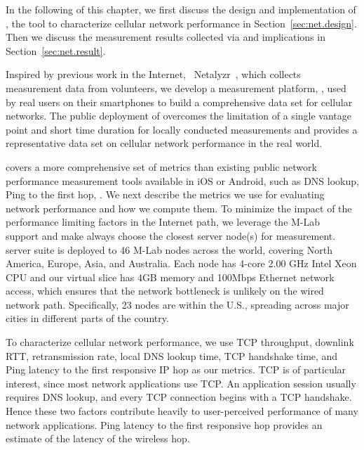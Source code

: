 In the following of this chapter, we first discuss the design and implementation of \mobiperf, the tool to characterize cellular network performance in Section~\ref{sec:net.design}. Then we discuss the measurement results collected via \mobiperf and implications in Section~\ref{sec:net.result}.


\label{sec:net.design}

Inspired by previous work in the Internet, \eg~Netalyzr~\cite{netalyzr}, which collects measurement data from volunteers, we develop a measurement platform, \mobiperf, used by real users on their smartphones to build a comprehensive data set for cellular networks. The public deployment of \mobiperf overcomes the limitation of a single vantage point and short time duration for locally conducted measurements and provides a representative data set on cellular network performance in the real world.

\mobiperf covers a more comprehensive set of metrics than existing public network performance measurement tools available in iOS or Android, such as DNS lookup, Ping to the first hop, \etc. We next describe the metrics we use for evaluating network performance and how we compute them. To minimize the impact of the performance limiting factors in the Internet path, we leverage the M-Lab~\cite{mlab} support and make \mobiperf always choose the closest server node(s) for measurement. \mobiperf server suite is deployed to 46 M-Lab nodes across the world, covering North America, Europe, Asia, and Australia.  Each node has 4-core 2.00 GHz Intel Xeon CPU and our virtual slice has 4GB memory and 100Mbps Ethernet network access, which ensures that the network bottleneck is unlikely on the wired network path. Specifically, 23 nodes are within the U.S., spreading across major cities in different parts of the country. 

To characterize cellular network performance, we use TCP throughput, downlink RTT, retransmission rate, local DNS lookup time, TCP handshake time, and Ping latency to the first responsive IP hop as our metrics. TCP is of particular interest, since most network applications use TCP. An application session usually requires DNS lookup, and every TCP connection begins with a TCP handshake. Hence these two factors contribute heavily to user-perceived performance of many network applications. Ping latency to the first responsive hop provides an estimate of the latency of the wireless hop.

